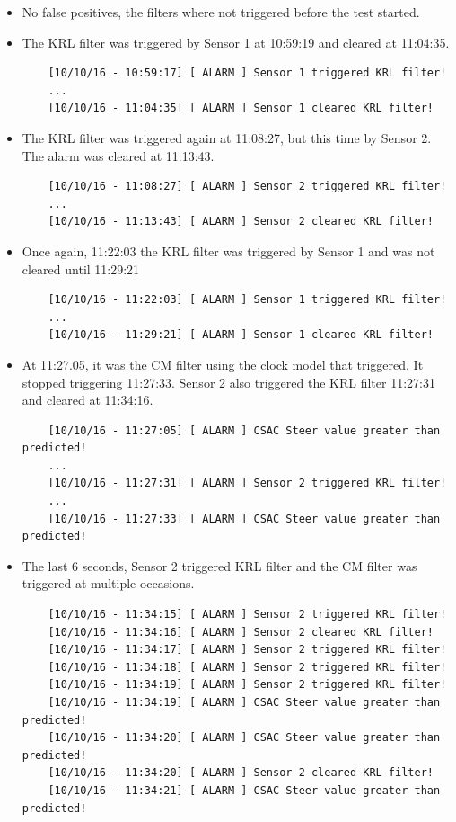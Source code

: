 \documentclass[12pt,english,a4paper]{report}
\begin{document}
\begin{itemize}
  \item No false positives, the filters where not triggered before the test started.
  \item The KRL filter was triggered by Sensor 1 at 10:59:19 and cleared at 11:04:35.
  \begin{lstlisting}
    [10/10/16 - 10:59:17] [ ALARM ] Sensor 1 triggered KRL filter!
    ...
    [10/10/16 - 11:04:35] [ ALARM ] Sensor 1 cleared KRL filter!
  \end{lstlisting}
  \item The KRL filter was triggered again at 11:08:27, but this time by Sensor 2. The alarm was cleared at 11:13:43.
    \begin{lstlisting}
    [10/10/16 - 11:08:27] [ ALARM ] Sensor 2 triggered KRL filter!
    ...
    [10/10/16 - 11:13:43] [ ALARM ] Sensor 2 cleared KRL filter!
  \end{lstlisting}
  \item Once again, 11:22:03 the KRL filter was triggered by Sensor 1 and was not cleared until 11:29:21
     \begin{lstlisting}
    [10/10/16 - 11:22:03] [ ALARM ] Sensor 1 triggered KRL filter!
    ...
    [10/10/16 - 11:29:21] [ ALARM ] Sensor 1 cleared KRL filter!
  \end{lstlisting} 
  \item At 11:27.05, it was the CM filter using the clock model that triggered. It stopped triggering 11:27:33. Sensor 2 also triggered the KRL filter 11:27:31 and cleared at 11:34:16.
    \begin{lstlisting}
    [10/10/16 - 11:27:05] [ ALARM ] CSAC Steer value greater than predicted!
    ...
    [10/10/16 - 11:27:31] [ ALARM ] Sensor 2 triggered KRL filter!
    ...
    [10/10/16 - 11:27:33] [ ALARM ] CSAC Steer value greater than predicted!
  \end{lstlisting} 
  \item The last 6 seconds, Sensor 2 triggered KRL filter and the CM filter was triggered at multiple occasions.
  \begin{lstlisting}
    [10/10/16 - 11:34:15] [ ALARM ] Sensor 2 triggered KRL filter!
    [10/10/16 - 11:34:16] [ ALARM ] Sensor 2 cleared KRL filter!
    [10/10/16 - 11:34:17] [ ALARM ] Sensor 2 triggered KRL filter!
    [10/10/16 - 11:34:18] [ ALARM ] Sensor 2 triggered KRL filter!
    [10/10/16 - 11:34:19] [ ALARM ] Sensor 2 triggered KRL filter!
    [10/10/16 - 11:34:19] [ ALARM ] CSAC Steer value greater than predicted!
    [10/10/16 - 11:34:20] [ ALARM ] CSAC Steer value greater than predicted!
    [10/10/16 - 11:34:20] [ ALARM ] Sensor 2 cleared KRL filter!
    [10/10/16 - 11:34:21] [ ALARM ] CSAC Steer value greater than predicted!
  \end{lstlisting} 
\end{itemize}
\end{document}
